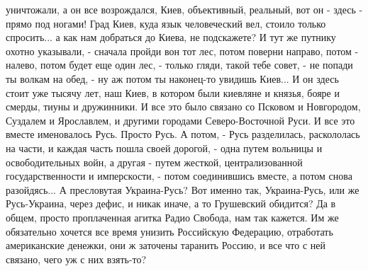 уничтожали, а он все возрождался, Киев, объективный, реальный, вот он - здесь -
прямо под ногами! Град Киев, куда язык человеческий вел, стоило только
спросить...  а как нам добраться до Киева, не подскажете? И тут же путнику
охотно указывали, - сначала пройди вон тот лес, потом поверни направо, потом -
налево, потом будет еще один лес, - только гляди, такой тебе совет, - не попади
ты волкам на обед, - ну аж потом ты наконец-то увидишь Киев...  И он здесь
стоит уже тысячу лет, наш Киев, в котором были киевляне и князья, бояре и
смерды, тиуны и дружинники. И все это было связано со Псковом и Новгородом,
Суздалем и Ярославлем, и другими городами Северо-Восточной Руси.  И все это
вместе именовалось Русь. Просто Русь. А потом, - Русь разделилась, раскололась
на части, и каждая часть пошла своей дорогой, - одна путем вольницы и
освободительных войн, а другая - путем жесткой, централизованной
государственности и имперскости, - потом соединившись вместе, а потом снова
разойдясь... А пресловутая Украина-Русь?  Вот именно так, Украина-Русь, или же
Русь-Украина, через дефис, и никак иначе, а то Грушевский обидится? Да в общем,
просто проплаченная агитка Радио Свобода, нам так кажется. Им же обязательно
хочется все время унизить Российскую Федерацию, отработать американские
денежки, они ж заточены таранить Россию, и все что с ней связано, чего уж с них
взять-то?

